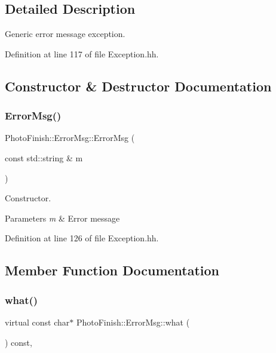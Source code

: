 \subsection{Detailed Description}
Generic error message exception. 

Definition at line 117 of file Exception.\+hh.



\subsection{Constructor \& Destructor Documentation}
\mbox{\label{class_photo_finish_1_1_error_msg_a3826ec6e30943811f584f93eb0247294}} 
\subsubsection{\texorpdfstring{Error\+Msg()}{ErrorMsg()}}
{\footnotesize\ttfamily Photo\+Finish\+::\+Error\+Msg\+::\+Error\+Msg (\begin{DoxyParamCaption}\item[{const std\+::string \&}]{m }\end{DoxyParamCaption})\hspace{0.3cm}{\ttfamily [inline]}}



Constructor. 


\begin{DoxyParams}{Parameters}
{\em m} & Error message \\
\hline
\end{DoxyParams}


Definition at line 126 of file Exception.\+hh.



\subsection{Member Function Documentation}
\mbox{\label{class_photo_finish_1_1_error_msg_ae84614a0c68520a7ad11e699c1504e82}} 
\subsubsection{\texorpdfstring{what()}{what()}}
{\footnotesize\ttfamily virtual const char$\ast$ Photo\+Finish\+::\+Error\+Msg\+::what (\begin{DoxyParamCaption}{ }\end{DoxyParamCaption}) const\hspace{0.3cm}{\ttfamily [pure virtual]}, {\ttfamily [noexcept]}}



